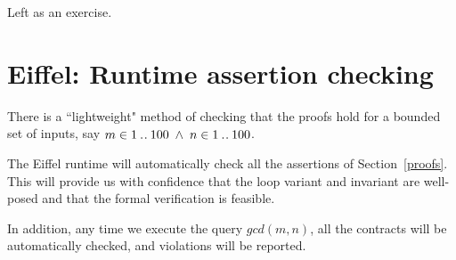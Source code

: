 \documentclass[runningheads,12pt]{article}
\begin{document}
Left as an exercise.

\section{Eiffel: Runtime assertion checking}
There is a ``lightweight" method of checking that the proofs hold for a bounded set of inputs, say $m \in 1\mathbin{.\mkern1mu.} 100 \; \land \; n \in 1\mathbin{.\mkern1mu.} 100$. 

The Eiffel runtime will automatically check all the assertions of Section~\ref{proofs}. This will provide us with confidence that the loop variant and invariant are well-posed and that the formal verification is feasible.

In addition, any time we execute the query $gcd(m,n)$, all the contracts will be automatically checked, and violations will be reported.   




\end{document}
